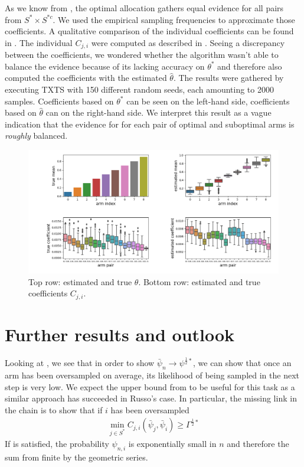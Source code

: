 As we know from , the optimal allocation
gathers equal evidence for all pairs from $S^* \times S^{*c}$. We used the
empirical sampling frequencies to approximate those coefficients. A qualitative
comparison of the individual coefficients can be found in
. The individual $C_{j, i}$ were computed as
described in . Seeing a discrepancy
between the coefficients, we wondered whether the algorithm wasn't able to
balance the evidence because of its lacking accuracy on $\theta^*$ and therefore
also computed the coefficients with the estimated $\hat{\theta}$. The results
were gathered by executing TXTS with 150 different random seeds, each amounting to 2000 samples. Coefficients based on $\theta^*$ can be seen on the left-hand side, coefficients based on $\hat{\theta}$ can on the right-hand side. We interpret this result as a vague indication that the evidence for for each pair of optimal and suboptimal arms is \emph{roughly} balanced.
\begin{figure}[h]
  \centering
  \includegraphics[width=\textwidth]{190909-coefficients_2000.png}
  \caption{Top row: estimated and true $\theta$. Bottom row: estimated and
      true coefficients $C_{j, i}$.}
  \label{fig:algorithm_coefficients}
\end{figure}

\section{Further results and outlook}\label{section:further_results}

Looking at , we see that in
order to show $\bar{\psi}_n \rightarrow \psi^{\frac{1}{2}*}$, we can show that
once an arm has been oversampled on average, its likelihood of being sampled in
the next step is very low. We expect the upper bound from
 to be useful for this task as a similar approach has
succeeded in Russo's case. In particular, the missing link in the chain is to
show that if $i$ has been oversampled
\begin{align}
  \min_{j \in S^*} C_{j, i}(\bar{\psi}_j, \bar{\psi}_i) \geq
      \Gamma^{\frac{1}{2}*} \label{eq:missing_link}
\end{align}
If  is satisfied, the
probability $\psi_{n, i}$ is exponentially small in $n$ and therefore the sum
from  finite by the geometric
series.

